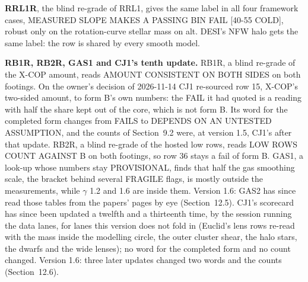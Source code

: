 \documentclass[10pt]{article}
\begin{document}
\textbf{RRL1R}, the blind re-grade of RRL1, gives the same label in all four framework cases, MEASURED SLOPE MAKES A PASSING BIN FAIL [40-55 COLD], robust only on the rotation-curve stellar mass on alt. DESI's NFW halo gets the same label: the row is shared by every smooth model.

\textbf{RB1R, RB2R, GAS1 and CJ1's tenth update.} RB1R, a blind re-grade of the X-COP amount, reads AMOUNT CONSISTENT ON BOTH SIDES on both footings. On the owner's decision of 2026-11-14 CJ1 re-sourced row 15, X-COP's two-sided amount, to form B's own numbers: the FAIL it had quoted is a reading with half the share kept out of the core, which is not form B. Its word for the completed form changes from FAILS to DEPENDS ON AN UNTESTED ASSUMPTION, and the counts of Section~9.2 were, at version 1.5, CJ1's after that update. RB2R, a blind re-grade of the hosted low rows, reads LOW ROWS COUNT AGAINST B on both footings, so row 36 stays a fail of form B. GAS1, a look-up whose numbers stay PROVISIONAL, finds that half the gas smoothing scale, the bracket behind several FRAGILE flags, is mostly outside the measurements, while $\gamma$ 1.2 and 1.6 are inside them. Version 1.6: GAS2 has since read those tables from the papers' pages by eye (Section~12.5). CJ1's scorecard has since been updated a twelfth and a thirteenth time, by the session running the data lanes, for lanes this version does not fold in (Euclid's lens rows re-read with the mass inside the modelling circle, the outer cluster shear, the halo stars, the dwarfs and the wide lenses); no word for the completed form and no count changed. Version 1.6: three later updates changed two words and the counts (Section~12.6).
\end{document}
